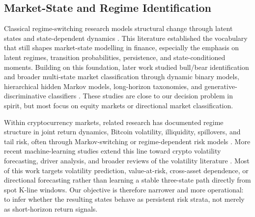 \documentclass[a4paper,fleqn]{cas-dc}
\begin{document}
\subsection{Market-State and Regime Identification}
Classical regime-switching research models structural change through latent states and state-dependent dynamics \cite{hamilton1989nonstationary,rabiner1989hmm,ang2012regime,mamon2007hmmfinance}. This literature established the vocabulary that still shapes market-state modelling in finance, especially the emphasis on latent regimes, transition probabilities, persistence, and state-conditioned moments. Building on this foundation, later work studied bull/bear identification and broader multi-state market classification through dynamic binary models, hierarchical hidden Markov models, long-horizon taxonomies, and generative-discriminative classifiers \cite{nyberg2013bearbull,oelschlager2023bullbear,wang2021bearbull,koukorinis2025regime}. These studies are close to our decision problem in spirit, but most focus on equity markets or directional market classification.

Within cryptocurrency markets, related research has documented regime structure in joint return dynamics, Bitcoin volatility, illiquidity, spillovers, and tail risk, often through Markov-switching or regime-dependent risk models \cite{figatalamanca2021crypto,ardia2019bitcoinvol,tan2021bitcoinmsgarch,elkhatib2024illiquid,kayal2024cryptovolnetwork,agakishiev2025forecasting,gao2022caviar,troster2019bitcoinrisk,borri2019tailrisk,koutmos2018liquidity,james2022evolutionary,shakourloo2026globaluncertainty}. More recent machine-learning studies extend this line toward crypto volatility forecasting, driver analysis, and broader reviews of the volatility literature \cite{wang2023cryptovolml,huang2024bitcoinvoldrivers,ahmed2024cryptovolreview}. Most of this work targets volatility prediction, value-at-risk, cross-asset dependence, or directional forecasting rather than learning a stable three-state path directly from spot K-line windows. Our objective is therefore narrower and more operational: to infer whether the resulting states behave as persistent risk strata, not merely as short-horizon return signals.
\end{document}
